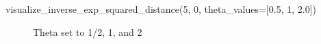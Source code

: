 \documentclass[
  letterpaper,
  DIV=11,
  numbers=noendperiod]{scrreprt}
\newenvironment{Shaded}{\begin{snugshade}}{\end{snugshade}}
\newcommand{\DecValTok}[1]{\textcolor[rgb]{0.68,0.00,0.00}{#1}}
\newcommand{\FloatTok}[1]{\textcolor[rgb]{0.68,0.00,0.00}{#1}}
\newcommand{\NormalTok}[1]{\textcolor[rgb]{0.00,0.23,0.31}{#1}}
\newcommand{\OperatorTok}[1]{\textcolor[rgb]{0.37,0.37,0.37}{#1}}
\begin{document}
\begin{Shaded}
\begin{Highlighting}[]
\NormalTok{visualize\_inverse\_exp\_squared\_distance(}\DecValTok{5}\NormalTok{, }\DecValTok{0}\NormalTok{, theta\_values}\OperatorTok{=}\NormalTok{[}\FloatTok{0.5}\NormalTok{, }\DecValTok{1}\NormalTok{, }\FloatTok{2.0}\NormalTok{])}
\end{Highlighting}
\end{Shaded}

\begin{figure}[H]


\caption{\label{fig-theta12}Theta set to 1/2, 1, and 2}

\end{figure}%
\end{document}

